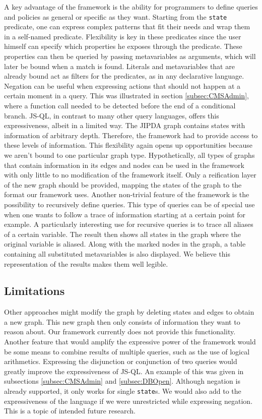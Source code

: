 A key advantage of the framework is the ability for programmers to define queries and policies as general or specific as they want. Starting from the \texttt{state} predicate, one can express complex patterns that fit their needs and wrap them in a self-named predicate. Flexibility is key in these predicates since the user himself can specify which properties he exposes through the predicate. These properties can then be queried by passing metavariables as arguments, which will later be bound when a match is found. Literals and metavariables that are already bound act as filters for the predicates, as in any declarative language.
Negation can be useful when expressing actions that should not happen at a certain moment in a query. This was illustrated in section \ref{subsec:CMSAdmin}, where a function call needed to be detected before the end of a conditional branch. JS-QL, in contrast to many other query languages, offers this expressiveness, albeit in a limited way. 
The JIPDA graph contains states with information of arbitrary depth. Therefore, the framework had to provide access to these levels of information. This flexibility again opens up opportunities because we aren't bound to one particular graph type. Hypothetically, all types of graphs that contain information in its edges and nodes can be used in the framework with only little to no modification of the framework itself. Only a reification layer of the new graph should be provided, mapping the states of the graph to the format our framework uses.
Another non-trivial feature of the framework is the possibility to recursively define queries. This type of queries can be of special use when one wants to follow a trace of information starting at a certain point for example. A particularly interesting use for recursive queries is to trace all aliases of a certain variable. The result then shows all states in the graph where the original variable is aliased. Along with the marked nodes in the graph, a table containing all substituted metavariables is also displayed. We believe this representation of the results makes them well legible.

\subsection{Limitations}

Other approaches might modify the graph by deleting states and edges to obtain a new graph. This new graph then only consists of information they want to reason about. Our framework currently does not provide this functionality. Another feature that would amplify the expressive power of the framework would be some means to combine results of multiple queries, such as the use of logical arithmetics. Expressing the disjunction or conjunction of two queries would greatly improve the expressiveness of JS-QL. An example of this was given in subsections \ref{subsec:CMSAdmin} and \ref{subsec:DBOpen}. 
Although negation is already supported, it only works for single \texttt{state}s. We would also add to the expressiveness of the language if we were unrestricted while expressing negation. This is a topic of intended future research.


